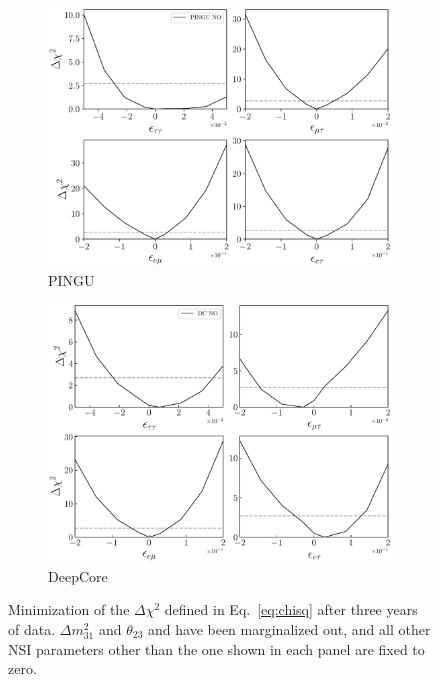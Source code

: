 \documentclass[draft=True]{revtex4-2}
\newcommand{\dm}{\Delta m^2_{31}}
\begin{document}
\begin{figure}[!tb]
   \begin{center}
      \begin{subfigure}{0.4\textwidth}
         \includegraphics[width=1\linewidth]{figures/PINGU_3D_NO.pdf}
         \caption{PINGU}\label{fig:PINGU_3D_NO}
      \end{subfigure}
      \hspace{1cm}
      \begin{subfigure}{0.4\textwidth}
         \includegraphics[width=1\linewidth]{figures/DC_3D_NO.pdf}
         \caption{DeepCore}\label{fig:DC_3D_NO}
      \end{subfigure}
    \end{center}
    \caption{Minimization of the $\Delta \chi^2$ defined in Eq.~\ref{eq:chisq} after three years of data.
    $\dm$ and $\theta_{23}$ and have been marginalized out, and all other NSI 
    parameters other than the one shown in each panel are fixed to zero.}\label{fig:3D_NO}
 \end{figure}
\end{document}
